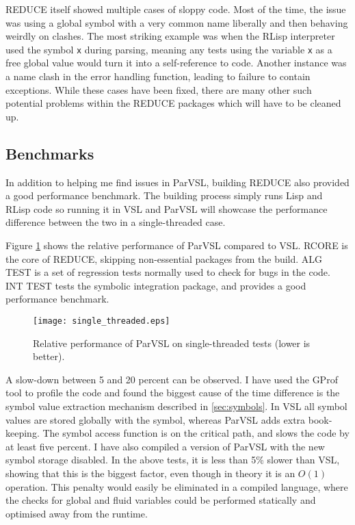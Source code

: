 REDUCE itself showed multiple cases of sloppy code. Most of the time, the issue was using
a global symbol with a very common name liberally and then behaving weirdly
on clashes. The most striking example was when the RLisp interpreter used the symbol \texttt{x}
during parsing, meaning any tests using the variable \texttt{x} as a free global value
would turn it into a self-reference to code.
Another instance was a name clash in the error handling function, leading to failure
to contain exceptions. While these cases have been fixed, there are many other
such potential problems within the REDUCE packages which will have to be cleaned up.

\subsection{Benchmarks}

In addition to helping me find issues in ParVSL, building REDUCE also provided a
good performance benchmark. The building process simply runs Lisp and RLisp code so
running it in VSL and ParVSL will showcase the performance difference between the
two in a single-threaded case.

Figure \ref{fig:single-threaded} shows the relative performance of ParVSL compared to VSL.
RCORE is the core of REDUCE, skipping non-essential packages from the build. ALG TEST is
a set of regression tests normally used to check for bugs in the code. INT TEST tests the
symbolic integration package, and provides a good performance benchmark.

\begin{figure}[H]
  \centering
  \texttt{[image: single\_threaded.eps]}
  \caption{Relative performance of ParVSL on single-threaded tests (lower is better).}
  \label{fig:single-threaded}
\end{figure}

A slow-down between 5 and 20 percent can be observed. I have used the GProf \cite{gprof}
tool to profile the code and found the biggest cause of the time difference is the
symbol value extraction mechanism described in \ref{sec:symbols}. In VSL all symbol
values are stored globally with the symbol, whereas ParVSL adds extra book-keeping.
The symbol access function is on the critical path, and slows the code by at least
five percent. I have also compiled a version of ParVSL with the new symbol
storage disabled. In the above tests, it is less than 5\% slower than VSL, showing
that this is the biggest factor, even though in theory it is an $O(1)$ operation.
This penalty would easily be eliminated in a compiled language, where the
checks for global and fluid variables could be performed statically and optimised away
from the runtime.

